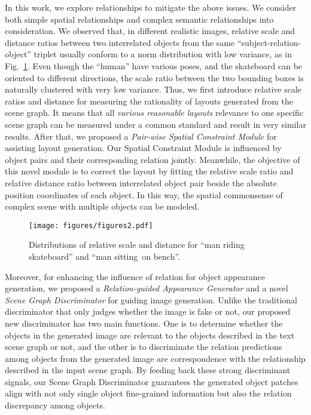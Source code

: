 In this work, we explore relationships to mitigate the above issues. We consider both simple spatial relationships and complex semantic relationships into consideration. We observed that, in different realistic images, relative scale and distance ratios between two interrelated objects from the same ``subject-relation-object'' triplet usually conform to a norm distribution with low variance, as in Fig.~\ref{fig:scale_dist_example}. Even though the ``human'' have various poses, and the skateboard can be oriented to different directions, the scale ratio between the two bounding boxes is naturally clustered with very low variance. Thus, we first introduce relative scale ratios and distance for measuring the rationality of layouts generated from the scene graph. It means that all \textit{various reasonable layouts} relevance to one specific scene graph can be measured under a common standard and result in very similar results. After that, we proposed a \textit{Pair-wise Spatial Constraint Module} for assisting layout generation. Our Spatial Constraint Module is influenced by object pairs and their corresponding relation jointly. Meanwhile, the objective of this novel module is to correct the layout by fitting the relative scale ratio and relative distance ratio between interrelated object pair beside the absolute position coordinates of each object. In this way, the spatial commonsense of complex scene with multiple objects can be modeled.

\begin{figure}[!t]
\centering
\texttt{[image: figures/figures2.pdf]}
\caption{Distributions of relative scale and distance for ``man riding  skateboard'' and ``man sitting~on bench''.}
\label{fig:scale_dist_example}
\end{figure}

Moreover, for enhancing the influence of relation for object appearance generation, we proposed a \textit{Relation-guided Appearance Generator} and a novel \textit{Scene Graph Discriminator} for guiding image generation. Unlike the traditional discriminator that only judges whether the image is fake or not, our proposed new discriminator has two main functions. One is to determine whether the objects in the generated image are relevant to the objects described in the text scene graph or not, and the other is to discriminate the relation predictions among objects from the generated image are correspondence with the relationship described in the input scene graph. By feeding back these strong discriminant signals, our Scene Graph Discriminator guarantees the generated object patches align with not only single object fine-grained information but also the relation discrepancy among objects. 

